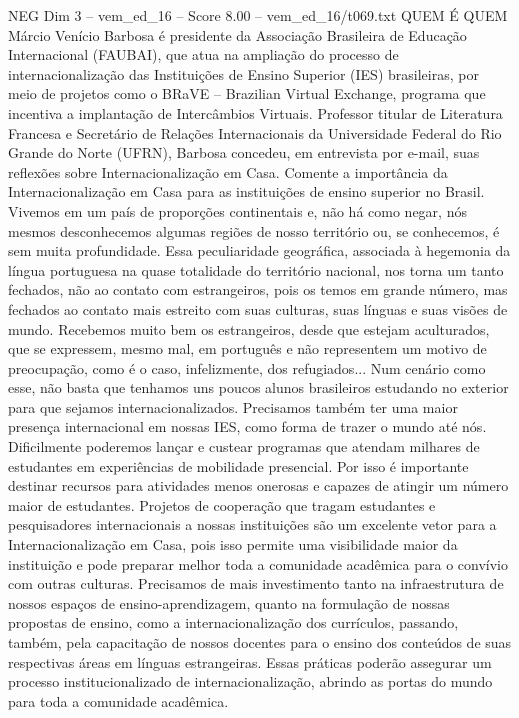 \begin{textsample}{NEG Dim 3 – vem\_ed\_16 – Score 8.00 – vem\_ed\_16/t069.txt}  \label{ex:f3_neg_169}
QUEM É QUEM Márcio Venício Barbosa é presidente da Associação Brasileira de Educação Internacional (FAUBAI), que atua na ampliação do processo de internacionalização das Instituições de Ensino Superior (IES) brasileiras, por meio de projetos como o BRaVE – Brazilian Virtual Exchange, programa que incentiva a implantação de Intercâmbios Virtuais.
Professor titular de Literatura Francesa e Secretário de Relações Internacionais da Universidade Federal do Rio Grande do Norte (UFRN), Barbosa concedeu, em entrevista por e-mail, suas reflexões sobre Internacionalização em Casa.
Comente a importância da Internacionalização em Casa para as instituições de ensino superior no Brasil.
Vivemos em um país de proporções continentais e, não há como negar, nós mesmos desconhecemos algumas regiões de nosso território ou, se conhecemos, é sem muita profundidade.
Essa peculiaridade geográfica, associada à hegemonia da língua portuguesa na quase totalidade do território nacional, nos torna um tanto fechados, não ao contato com estrangeiros, pois os temos em grande número, mas fechados ao contato mais estreito com suas culturas, suas línguas e suas visões de mundo.
Recebemos muito bem os estrangeiros, desde que estejam aculturados, que se expressem, mesmo mal, em português e não representem um motivo de preocupação, como é o caso, infelizmente, dos refugiados...
Num cenário como esse, não basta que tenhamos uns poucos alunos brasileiros estudando no exterior para que sejamos internacionalizados.
Precisamos também ter uma maior presença internacional em nossas IES, como forma de trazer o mundo até nós.
Dificilmente poderemos lançar e custear programas que atendam milhares de estudantes em experiências de mobilidade presencial.
Por isso é importante destinar recursos para atividades menos onerosas e capazes de atingir um número maior de estudantes.
Projetos de cooperação que tragam estudantes e pesquisadores internacionais a nossas instituições são um excelente vetor para a Internacionalização em Casa, pois isso permite uma visibilidade maior da instituição e pode preparar melhor toda a comunidade acadêmica para o convívio com outras culturas.
Precisamos de mais investimento tanto na infraestrutura de nossos espaços de ensino-aprendizagem, quanto na formulação de nossas propostas de ensino, como a internacionalização dos currículos, passando, também, pela capacitação de nossos docentes para o ensino dos conteúdos de suas respectivas áreas em línguas estrangeiras.
Essas práticas poderão assegurar um processo institucionalizado de internacionalização, abrindo as portas do mundo para toda a comunidade acadêmica.

\end{textsample}
